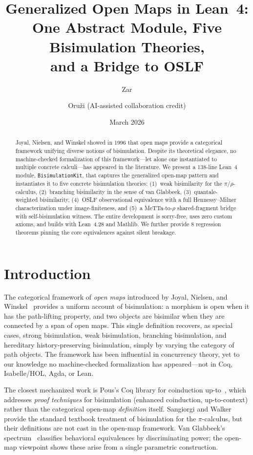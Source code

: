 \documentclass[11pt]{article}
\title{Generalized Open Maps in Lean~4:\\One Abstract Module, Five Bisimulation Theories,\\and a Bridge to OSLF}
\author{Zar \and Oru\v{z}i (AI-assisted collaboration credit)}
\date{March 2026}
\begin{document}
\maketitle

\begin{abstract}
Joyal, Nielsen, and Winskel showed in 1996 that open maps provide a
categorical framework unifying diverse notions of bisimulation.  Despite
its theoretical elegance, no machine-checked formalization of this
framework---let alone one instantiated to multiple concrete
calculi---has appeared in the literature.  We present a 138-line Lean~4
module, \texttt{BisimulationKit}, that captures the generalized open-map
pattern and instantiates it to five concrete bisimulation theories:
(1)~weak bisimilarity for the $\pi$/$\rho$-calculus,
(2)~branching bisimilarity in the sense of van Glabbeek,
(3)~quantale-weighted bisimilarity,
(4)~OSLF observational equivalence with a full Hennessy--Milner
characterization under image-finiteness, and
(5)~a MeTTa-to-$\rho$ shared-fragment bridge with self-bisimulation
witness.
The entire development is sorry-free, uses zero custom axioms, and
builds with Lean~4.28 and Mathlib.  We further provide 8 regression
theorems pinning the core equivalences against silent breakage.
\end{abstract}


\section{Introduction}\label{sec:intro}

The categorical framework of \emph{open maps} introduced by Joyal,
Nielsen, and Winskel~\cite{JoyalNielsenWinskel1996} provides a uniform
account of bisimulation: a morphism is open when it has the path-lifting
property, and two objects are bisimilar when they are connected by a span
of open maps.  This single definition recovers, as special cases, strong
bisimulation, weak bisimulation, branching bisimulation, and hereditary
history-preserving bisimulation, simply by varying the category of path
objects.  The framework has been influential in concurrency theory, yet
to our knowledge no machine-checked formalization has appeared---not in
Coq, Isabelle/HOL, Agda, or Lean.

The closest mechanized work is Pous's Coq library for coinduction
up-to~\cite{Pous2016}, which addresses \emph{proof techniques} for
bisimulation (enhanced coinduction, up-to-context) rather than the
categorical open-map \emph{definition} itself.  Sangiorgi and
Walker~\cite{SangiorgiWalker2001} provide the standard textbook
treatment of bisimulation for the $\pi$-calculus, but their definitions
are not cast in the open-map framework.  Van Glabbeek's
spectrum~\cite{vanGlabbeek1993,vanGlabbeek2001} classifies behavioral
equivalences by discriminating power; the open-map viewpoint shows these
arise from a single parametric construction.
\end{document}
